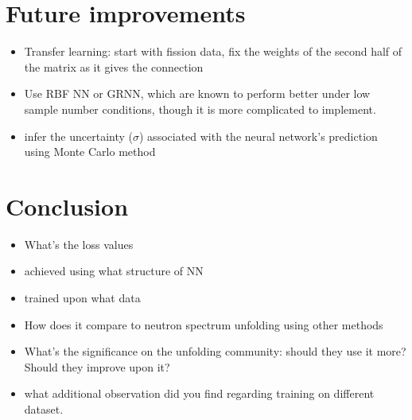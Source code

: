 \documentclass[a4paper, 12pt]{article}
\begin{document}
\section{Future improvements}
\begin{itemize}
    \item Transfer learning: start with fission data, fix the weights of the second half of the matrix as it gives the connection
    \item Use RBF NN or GRNN, which are known to perform better under low sample number conditions, though it is more complicated to implement.
    \item infer the uncertainty ($\sigma$) associated with the neural network's prediction using Monte Carlo method
\end{itemize}

\section{Conclusion}
\begin{itemize}
    \item What's the loss values
    \item achieved using what structure of NN
    \item trained upon what data
    \item How does it compare to neutron spectrum unfolding using other methods
    \item What's the significance on the unfolding community: should they use it more? Should they improve upon it?
    \item what additional observation did you find regarding training on different dataset.
\end{itemize}



\end{document}
